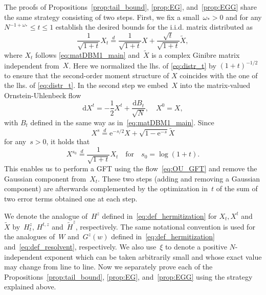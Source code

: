 \documentclass[10pt]{amsart}
\numberwithin{equation}{section}
\newcommand{\dif}{\mathrm{d}}
\newcommand{\ee}{\mathrm{e}}
\begin{document}
The proofs of Propositions~\ref{prop:tail_bound}, \ref{prop:EG}, and~\ref{prop:EGG} share the same strategy consisting of two steps. First, we fix a small~$\omega_*>0$ and for any $N^{-1+\omega_*}\le t\le 1$ establish the desired bounds for the i.i.d. matrix distributed as 
\begin{equation}
\frac{1}{\sqrt{1+t}}X_t\stackrel{d}{=} \frac{1}{\sqrt{1+t}}X + \frac{\sqrt{t}}{\sqrt{1+t}}\widetilde{X}, 
\label{eq:distr_t}
\end{equation}
where $X_t$ follows \eqref{eq:matDBM1_main} and~$\widetilde{X}$ is a complex Ginibre matrix independent from~$X$. Here we normalized the lhs. of \eqref{eq:distr_t} by $(1+t)^{-1/2}$ to ensure that the second-order moment structure of $X$ coincides with the one of the lhs. of \eqref{eq:distr_t}. In the second step we embed~$X$ into the matrix-valued Ornstein-Uhlenbeck flow
\begin{equation}
\dif X^t = -\frac{1}{2}X^t +\frac{\dif B_t}{\sqrt{N}},\quad X^0=X, 
\label{eq:OU_GFT}
\end{equation}
with $B_t$ defined in the same way as in~\eqref{eq:matDBM1_main}. Since
\begin{equation}
X^s\stackrel{d}{=} \ee^{-s/2}X+\sqrt{1-\ee^{-s}}\widetilde{X}
\label{eq:distr_GFT}
\end{equation}
for any~$s>0$, it holds that
\begin{equation}
X^{s_0}\stackrel{d}{=}\frac{1}{\sqrt{1+t}}X_t\quad\text{for}\quad s_0=\log(1+t).
\label{eq:strat_concl}
\end{equation}
This enables us to perform a GFT using the flow~\eqref{eq:OU_GFT} and remove the Gaussian component from~$X_t$. These two steps (adding and removing a Gaussian component) are afterwards complemented by the optimization in~$t$ of the sum of two error terms obtained one at each step.  


We denote the analogue of~$H^z$ defined in~\eqref{eq:def_hermitization} for $X_t, X^t$ and~$\widetilde{X}$ by~$H^z_t$, $H^{t,z}$ and~$\widetilde{H}^z$, respectively. The same notational convention is used for the analogues of~$W$ and~$G^z(w)$ defined in~\eqref{eq:def_hermitization} and~\eqref{eq:def_resolvent}, respectively. We also use~$\xi$ to denote a positive $N$-independent exponent which can be taken arbitrarily small and whose exact value may change from line to line. Now we separately prove each of the Propositions~\ref{prop:tail_bound}, \ref{prop:EG}, and~\ref{prop:EGG} using the strategy explained above.
\end{document}

